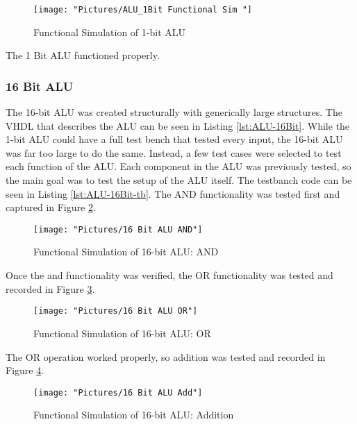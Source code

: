 \documentclass[11pt]{article}
\begin{document}
			\begin{figure}[H]
				\centering
				\texttt{[image: "Pictures/ALU\_1Bit Functional Sim "]}
				\caption{Functional Simulation of 1-bit ALU}
				\label{fig:alu1bit-functional-sim-}
			\end{figure}
		
			The 1 Bit ALU functioned properly.
		
		\subsubsection{16 Bit ALU}
		
			The 16-bit ALU was created structurally with generically large structures. The VHDL that describes the ALU can be seen in Listing \ref{lst:ALU-16Bit}. While the 1-bit ALU could have a full test bench that tested every input, the 16-bit ALU was far too large to do the same. Instead, a few test cases were selected to test each function of the ALU. Each component in the ALU was previously tested, so the main goal was to test the setup of the ALU itself. The testbanch code can be seen in Listing \ref{lst:ALU-16Bit-tb}. The AND functionality was tested first and captured in Figure \ref{fig:16-bit-alu-and}.
		
			\begin{figure}[H]
				\centering
				\texttt{[image: "Pictures/16 Bit ALU AND"]}
				\caption{Functional Simulation of 16-bit ALU: AND}
				\label{fig:16-bit-alu-and}
			\end{figure}
		
			Once the and functionality was verified, the OR functionality was tested and recorded in Figure \ref{fig:16-bit-alu-or}.
		
			\begin{figure}[H]
				\centering
				\texttt{[image: "Pictures/16 Bit ALU OR"]}
				\caption{Functional Simulation of 16-bit ALU: OR}
				\label{fig:16-bit-alu-or}
			\end{figure}
			
			The OR operation worked properly, so addition was tested and recorded in Figure \ref{fig:16-bit-alu-add}.
			
			\begin{figure}[H]
				\centering
				\texttt{[image: "Pictures/16 Bit ALU Add"]}
				\caption{Functional Simulation of 16-bit ALU: Addition}
				\label{fig:16-bit-alu-add}
			\end{figure}
		
\end{document}
